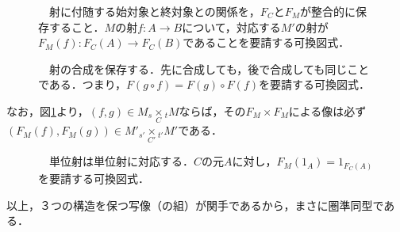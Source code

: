 \documentclass[uplatex, 12pt, dvipdfmx]{jsreport}
\begin{document}
\begin{figure}[ht]\begin{center} \caption{\label{cd-5}　射に付随する始対象と終対象との関係を，$F_C$と$F_M$が整合的に保存すること．$M$の射$f:A\to B$について，対応する$M'$の射が$F_M(f):F_C(A)\to F_C(B)$であることを要請する可換図式．}
\end{center}\end{figure}

\begin{figure}[ht]\begin{center} \caption{\label{cd-6}　射の合成を保存する．先に合成しても，後で合成しても同じことである．つまり，$F(g\circ f)=F(g)\circ F(f)$を要請する可換図式．}
\end{center}\end{figure}
なお，図\ref{cd-5}より，$(f,g)\in M_s\underset{C}{\times}{}_tM$ならば，その$F_M\times F_M$による像は必ず$(F_M(f),F_M(g))\in M'_{s'}\underset{C'}{\times}{}_{t'}M'$である．

\begin{figure}[ht]\begin{center} \caption{\label{cd-7}　単位射は単位射に対応する．$C$の元$A$に対し，$F_M(1_A)=1_{F_C(A)}$を要請する可換図式．}
\end{center}\end{figure}

以上，３つの構造を保つ写像（の組）が関手であるから，まさに圏準同型である．
\end{document}
